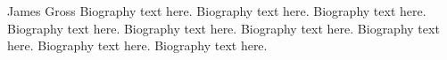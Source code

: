\documentclass[10pt,journal,compsoc]{IEEEtran}
\theoremstyle{mytheoremstyle}
\theoremstyle{mytheoremstyle}
\theoremstyle{mytheoremstyle}
\begin{document}


\begin{IEEEbiography}{James Gross}
Biography text here.
Biography text here.
Biography text here.
Biography text here.
Biography text here.
Biography text here.
Biography text here.
Biography text here.
Biography text here.
\end{IEEEbiography}








\end{document}
